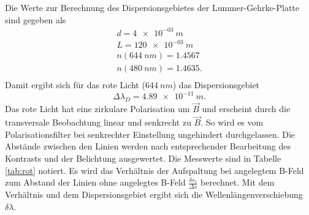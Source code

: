 Die Werte zur Berechnung des Dispersionsgebietes der Lummer-Gehrke-Platte sind gegeben als
\begin{align*}
d         = \SI{4 e-03}{m}    \\
L         = \SI{120 e-03}{m}    \\
n(\SI{644}{nm})  = 1.4567    \\
n(\SI{480}{nm})  = 1.4635.    \\
\end{align*}
Damit ergibt sich für das rote Licht ($\SI{644}{nm}$) das Dispersionsgebiet
\begin{equation*}
  \Delta \lambda_D = \SI{4.89e-11}{m}.
\end{equation*}
Das rote Licht hat eine zirkulare Polarisation um $\vec{B}$ und erscheint durch die transversale Beobachtung linear und senkrecht zu $\vec{B}$.
So wird es vom Polarisationsfilter bei senkrechter Einstellung ungehindert durchgelassen.
Die Abstände zwischen den Linien werden nach entsprechender Bearbeitung des Kontrasts und der Belichtung ausgewertet.
Die Messwerte sind in Tabelle \ref{tab:rot} notiert.
Es wird das Verhältnis der Aufspaltung bei angelegtem B-Feld zum Abstand der Linien ohne angelegtes B-Feld $\frac{\delta s_{1}}{\Delta s}$ berechnet.
Mit dem Verhältnis und dem Dispersionsgebiet ergibt sich die Wellenlängenverschiebung $\delta \lambda$.
%
%
